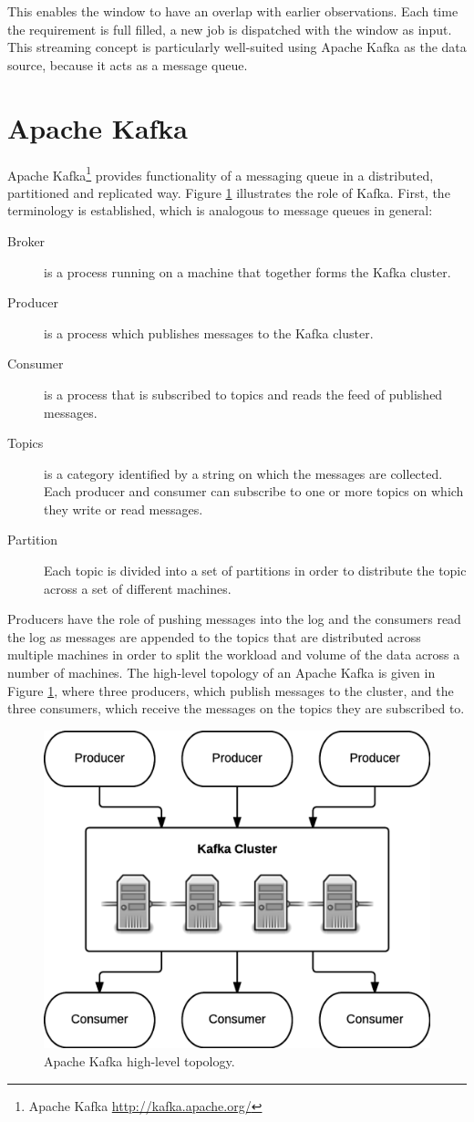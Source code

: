 This enables the window to have an overlap with earlier observations. Each time the requirement is full filled, a new job is dispatched with the window as input. This streaming concept is particularly well-suited using Apache Kafka as the data source, because it acts as a message queue.

\section{Apache Kafka \label{subsec_kafka}}

Apache Kafka\footnote{Apache Kafka \url{http://kafka.apache.org/}} provides functionality of a messaging queue in a distributed, partitioned and replicated way. Figure \ref{fig:kafka} illustrates the role of Kafka. First, the terminology is established, which is analogous to message queues in general:
\begin{description}
    \item[Broker] is a process running on a machine that together forms the Kafka cluster. 
    \item[Producer] is a process which publishes messages to the Kafka cluster.
    \item[Consumer] is a process that is subscribed to topics and reads the feed of published messages.
    \item[Topics] is a category identified by a string on which the messages are collected. Each producer and consumer can subscribe to one or more topics on which they write or read messages.
    \item[Partition] Each topic is divided into a set of partitions in order to distribute the topic across a set of different machines.
\end{description}

Producers have the role of pushing messages into the log and the consumers read the log as messages are appended to the topics that are distributed across multiple machines in order to split the workload and volume of the data across a number of machines. The high-level topology of an Apache Kafka is given in Figure \ref{fig:kafka}, where three producers, which publish messages to the cluster, and the three consumers, which receive the messages on the topics they are subscribed to.

\begin{figure}[ht!]
\centering
\includegraphics[width=.7\textwidth]{figures/kafka.png}
\caption{Apache Kafka high-level topology. \label{fig:kafka}}
\end{figure}

